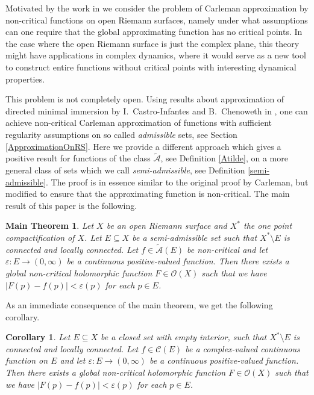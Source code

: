 \documentclass[a4paper,11pt]{amsart}
\newcommand{\abs}[1]{\left|#1\right|}
\newtheorem*{main}{Main Theorem}
\newtheorem*{corollary}{Corollary}
\begin{document}
Motivated by the work in \cite{franc} we consider the problem of Carleman approximation by non-critical functions on open Riemann surfaces, namely under what assumptions can one require that the global approximating function has no critical points.
In the case where the open Riemann surface is just the complex plane, this theory might have applications in complex dynamics, where it would serve as a new tool to construct entire functions without critical points with interesting dynamical properties.

This problem is not completely open. 
Using results about approximation of directed minimal immersion by I.~Castro-Infantes and B.~Chenoweth in \cite{BrettCastro}, one can achieve non-critical Carleman approximation of functions with sufficient regularity assumptions on so called \emph{admissible} sets, see Section \ref{ApproximationOnRS}. 
Here we provide a different approach which gives a positive result for functions of the class $\widetilde{\mathcal{A}}$, see Definition \ref{Atilde}, on a more general class of sets which we call \emph{semi-admissible}, see Definition \ref{semi-admissible}.
The proof is in essence similar to the original proof by Carleman, but modified to ensure that the approximating function is non-critical. 
The main result of this paper is the following.

\begin{main}
    Let $X$ be an open Riemann surface and $X^*$ the one point compactification of $X$.
    Let $E \subseteq X$ be a semi-admissible set such that $X^* \setminus E$ is connected and locally connected. 
    Let $f \in \widetilde{\mathcal{A}}(E)$ be non-critical and let $\varepsilon \colon E \to (0, \infty)$ be a continuous positive-valued function.
    Then there exists a global non-critical holomorphic function $F \in \mathcal{O}(X)$ such that we have $\abs{F(p) - f(p)} < \varepsilon(p)$ for each $p \in E$. 
\end{main}

As an immediate consequence of the main theorem, we get the following corollary.

\begin{corollary}
    Let $E \subseteq X$ be a closed set with empty interior, such that $X^*\setminus E$ is connected and locally connected.
    Let $f \in \mathcal{C}(E)$ be a complex-valued continuous function on $E$ and let $\varepsilon \colon E \to (0, \infty)$ be a continuous positive-valued function.
    Then there exists a global non-critical holomorphic function $F \in \mathcal{O}(X)$ such that we have $\abs{F(p) - f(p)} < \varepsilon(p)$ for each $p \in E$. 
\end{corollary}
\end{document}
